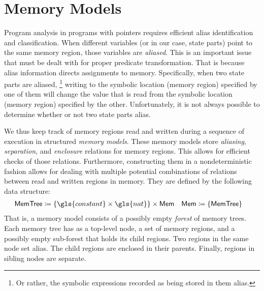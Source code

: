 \section{Memory Models}\label{sec:memory-models}
Program analysis
in programs with pointers
requires efficient alias identification and classification.
When different variables
(or in our case, state parts)
point to the same memory region, those variables are \emph{aliased}.
This is an important issue that must be dealt with for proper predicate transformation.
That is because alias information directs assignments to memory.
Specifically, when two state parts are aliased,%
\footnote{Or rather, the symbolic expressions
  recorded as being stored in them alias.}
writing to the symbolic location (memory region) specified by one of them will change the value that is read from the symbolic location (memory region) specified by the other.
Unfortunately, it is not always possible to determine whether or not
two state parts alias.

We thus keep track of memory regions read and written during a sequence of execution in structured \emph{memory models}.%
%
These memory models store \emph{aliasing}, \emph{separation},%
and \emph{enclosure}
relations for memory regions.
This allows for efficient checks of those relations.
Furthermore, constructing them in a nondeterministic
fashion allows for dealing with multiple potential combinations of relations
between read and written regions in memory.
They are defined by the following data structure:
\begin{align*}
  \mathsf{MemTree} &\coloneqq
  \{\gls{constant}\times\gls{nat}\}\times\mathsf{Mem}
  &
  \mathsf{Mem} &\coloneqq \{\mathsf{MemTree}\}
\end{align*}
That is,
a memory model consists of a possibly empty \emph{forest} of memory trees.%
%
Each memory tree has as a top-level node,
a set of memory regions,
and a possibly empty sub-forest that holds its child regions.
Two regions in the same node set alias.
The child regions are enclosed in their parents.
Finally, regions in sibling nodes are separate.

